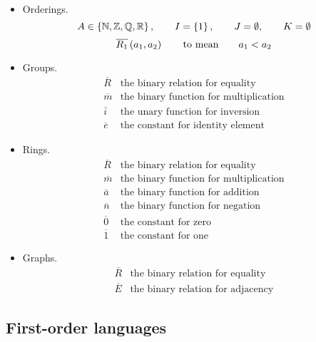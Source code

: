 \pagebreak

\begin{example}
\label{eg:2.1.3}
\hfill
\begin{itemize}
\item Orderings.
$$ A \in \left\{ \mathbb{N}, \mathbb{Z}, \mathbb{Q}, \mathbb{R} \right\}, \qquad I = \left\{ 1 \right\}, \qquad J = \emptyset, \qquad K = \emptyset $$
$$ \overline{R_1}\left( a_1, a_2 \right) \qquad \text{to mean} \qquad a_1 < a_2 $$
\item Groups.
$$
\begin{array}{ll}
\overline{R} & \text{the binary relation for equality} \\
\overline{m} & \text{the binary function for multiplication} \\
\overline{i} & \text{the unary function for inversion} \\
\overline{e} & \text{the constant for identity element}
\end{array}
$$
\item Rings.
$$
\begin{array}{ll}
\overline{R} & \text{the binary relation for equality} \\
\overline{m} & \text{the binary function for multiplication} \\
\overline{a} & \text{the binary function for addition} \\
\overline{n} & \text{the binary function for negation} \\
\overline{0} & \text{the constant for zero} \\
\overline{1} & \text{the constant for one}
\end{array}
$$
\item Graphs.
$$
\begin{array}{ll}
\overline{R} & \text{the binary relation for equality} \\
\overline{E} & \text{the binary relation for adjacency}
\end{array}
$$
\end{itemize}
\end{example}

\subsection{First-order languages}

